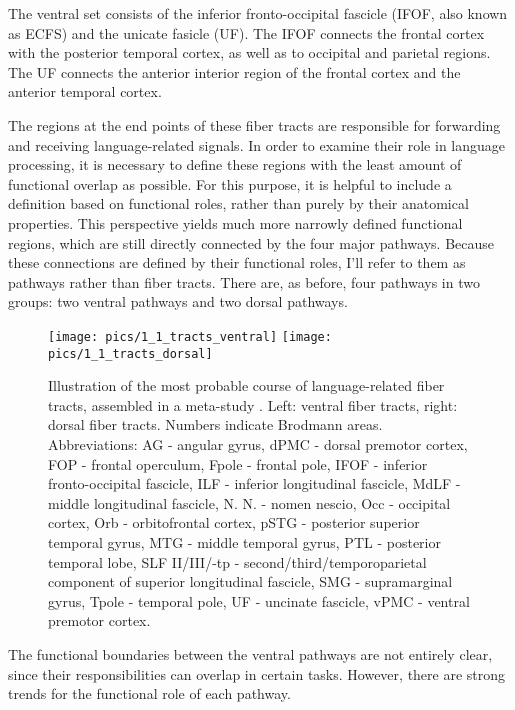 The ventral set consists of the inferior fronto-occipital fascicle (IFOF, also known as ECFS) and the unicate fasicle (UF).
The IFOF connects the frontal cortex with the posterior temporal cortex, as well as to occipital and parietal regions.
The UF connects the anterior interior region of the frontal cortex and the anterior temporal cortex.

The regions at the end points of these fiber tracts are responsible for forwarding and receiving language-related signals.
In order to examine their role in language processing, it is necessary to define these regions with the least amount of functional overlap as possible.
For this purpose, it is helpful to include a definition based on functional roles, rather than purely by their anatomical properties.
This perspective \cite{1.1.pathways} yields much more narrowly defined functional regions, which are still directly connected by the four major pathways.
Because these connections are defined by their functional roles, I'll refer to them as pathways rather than fiber tracts.
There are, as before, four pathways in two groups: two ventral pathways and two dorsal pathways.

\clearpage

\begin{figure}[h]
\begin{center}
\vspace{7mm}
\texttt{[image: pics/1\_1\_tracts\_ventral]}
\texttt{[image: pics/1\_1\_tracts\_dorsal]}
\caption{\label{1.1.tracts}Illustration of the most probable course of language-related fiber tracts, assembled in a meta-study \cite{1.1.Gierhan}. Left: ventral fiber tracts, right: dorsal fiber tracts. Numbers indicate Brodmann areas. Abbreviations: AG - angular gyrus, dPMC - dorsal premotor cortex, FOP - frontal operculum, Fpole - frontal pole, IFOF - inferior fronto-occipital fascicle, ILF - inferior longitudinal fascicle, MdLF - middle longitudinal fascicle, N. N. - nomen nescio, Occ - occipital cortex, Orb - orbitofrontal cortex, pSTG - posterior superior temporal gyrus, MTG - middle temporal gyrus, PTL - posterior temporal lobe, SLF II/III/-tp - second/third/temporoparietal component of superior longitudinal fascicle, SMG - supramarginal gyrus, Tpole - temporal pole, UF - uncinate fascicle, vPMC - ventral premotor cortex.}
\end{center}
\end{figure}

The functional boundaries between the ventral pathways are not entirely clear, since their responsibilities can overlap in certain tasks.
However, there are strong trends for the functional role of each pathway.

